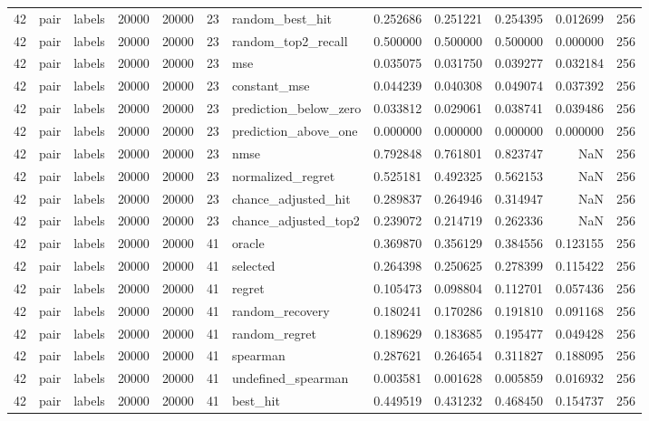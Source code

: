 \begin{tabular}{rllrrrlrrrrr}
42 & pair & labels & 20000 & 20000 & 23 & random_best_hit & 0.252686 & 0.251221 & 0.254395 & 0.012699 & 256 \\
42 & pair & labels & 20000 & 20000 & 23 & random_top2_recall & 0.500000 & 0.500000 & 0.500000 & 0.000000 & 256 \\
42 & pair & labels & 20000 & 20000 & 23 & mse & 0.035075 & 0.031750 & 0.039277 & 0.032184 & 256 \\
42 & pair & labels & 20000 & 20000 & 23 & constant_mse & 0.044239 & 0.040308 & 0.049074 & 0.037392 & 256 \\
42 & pair & labels & 20000 & 20000 & 23 & prediction_below_zero & 0.033812 & 0.029061 & 0.038741 & 0.039486 & 256 \\
42 & pair & labels & 20000 & 20000 & 23 & prediction_above_one & 0.000000 & 0.000000 & 0.000000 & 0.000000 & 256 \\
42 & pair & labels & 20000 & 20000 & 23 & nmse & 0.792848 & 0.761801 & 0.823747 & NaN & 256 \\
42 & pair & labels & 20000 & 20000 & 23 & normalized_regret & 0.525181 & 0.492325 & 0.562153 & NaN & 256 \\
42 & pair & labels & 20000 & 20000 & 23 & chance_adjusted_hit & 0.289837 & 0.264946 & 0.314947 & NaN & 256 \\
42 & pair & labels & 20000 & 20000 & 23 & chance_adjusted_top2 & 0.239072 & 0.214719 & 0.262336 & NaN & 256 \\
42 & pair & labels & 20000 & 20000 & 41 & oracle & 0.369870 & 0.356129 & 0.384556 & 0.123155 & 256 \\
42 & pair & labels & 20000 & 20000 & 41 & selected & 0.264398 & 0.250625 & 0.278399 & 0.115422 & 256 \\
42 & pair & labels & 20000 & 20000 & 41 & regret & 0.105473 & 0.098804 & 0.112701 & 0.057436 & 256 \\
42 & pair & labels & 20000 & 20000 & 41 & random_recovery & 0.180241 & 0.170286 & 0.191810 & 0.091168 & 256 \\
42 & pair & labels & 20000 & 20000 & 41 & random_regret & 0.189629 & 0.183685 & 0.195477 & 0.049428 & 256 \\
42 & pair & labels & 20000 & 20000 & 41 & spearman & 0.287621 & 0.264654 & 0.311827 & 0.188095 & 256 \\
42 & pair & labels & 20000 & 20000 & 41 & undefined_spearman & 0.003581 & 0.001628 & 0.005859 & 0.016932 & 256 \\
42 & pair & labels & 20000 & 20000 & 41 & best_hit & 0.449519 & 0.431232 & 0.468450 & 0.154737 & 256 \\

\end{tabular}

